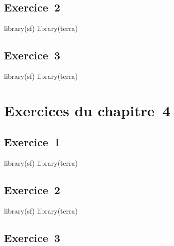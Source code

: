\documentclass[
  letterpaper,
  DIV=11,
  numbers=noendperiod]{scrreprt}
\newenvironment{Shaded}{\begin{snugshade}}{\end{snugshade}}
\newcommand{\NormalTok}[1]{\textcolor[rgb]{0.00,0.23,0.31}{#1}}
\begin{document}
\subsection{Exercice~2}\label{sec-08032}

\begin{Shaded}
\begin{Highlighting}[]
\NormalTok{library(sf)}
\NormalTok{library(terra)}
\end{Highlighting}
\end{Shaded}

\subsection{Exercice~3}\label{sec-08033}

\begin{Shaded}
\begin{Highlighting}[]
\NormalTok{library(sf)}
\NormalTok{library(terra)}
\end{Highlighting}
\end{Shaded}

\section{Exercices du chapitre~4}\label{sec-0804}

\subsection{Exercice~1}\label{sec-08041}

\begin{Shaded}
\begin{Highlighting}[]
\NormalTok{library(sf)}
\NormalTok{library(terra)}
\end{Highlighting}
\end{Shaded}

\subsection{Exercice~2}\label{sec-08042}

\begin{Shaded}
\begin{Highlighting}[]
\NormalTok{library(sf)}
\NormalTok{library(terra)}
\end{Highlighting}
\end{Shaded}

\subsection{Exercice~3}\label{sec-08043}
\end{document}
